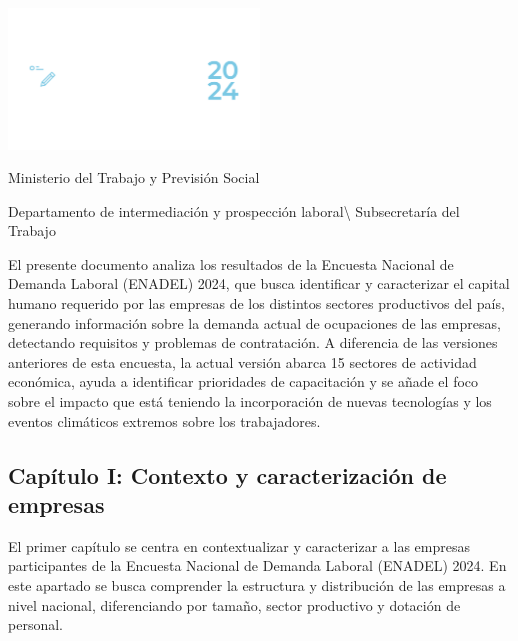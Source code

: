 \documentclass[
  11pt,
]{article}
\author{}
\date{}
\renewcommand*\contentsname{Tabla de contenidos}
\newcommand\contentsname{Tabla de contenidos}
\begin{document}




\pagecolor{customblue} 
\thispagestyle{empty} 
\color{white}

\centering

\includegraphics[width=0.5\textwidth]{../Logotipo ENADEL/Logotipo ENADEL-02.png}
\vspace{2cm}

\noindent Ministerio del Trabajo y Previsión Social

Departamento de intermediación y prospección laboral\textbackslash{}
Subsecretaría del Trabajo

\justifying

El presente documento analiza los resultados de la Encuesta Nacional de
Demanda Laboral (ENADEL) 2024, que busca identificar y caracterizar el
capital humano requerido por las empresas de los distintos sectores
productivos del país, generando información sobre la demanda actual de
ocupaciones de las empresas, detectando requisitos y problemas de
contratación. A diferencia de las versiones anteriores de esta encuesta,
la actual versión abarca 15 sectores de actividad económica, ayuda a
identificar prioridades de capacitación y se añade el foco sobre el
impacto que está teniendo la incorporación de nuevas tecnologías y los
eventos climáticos extremos sobre los trabajadores.

\newpage
\nopagecolor
\color{black}
\renewcommand{\contentsname}{Índice} 
\tableofcontents

\newpage

\subsection{Capítulo I: Contexto y caracterización de
empresas}\label{capuxedtulo-i-contexto-y-caracterizaciuxf3n-de-empresas}

El primer capítulo se centra en contextualizar y caracterizar a las
empresas participantes de la Encuesta Nacional de Demanda Laboral
(ENADEL) 2024. En este apartado se busca comprender la estructura y
distribución de las empresas a nivel nacional, diferenciando por tamaño,
sector productivo y dotación de personal.
\end{document}
